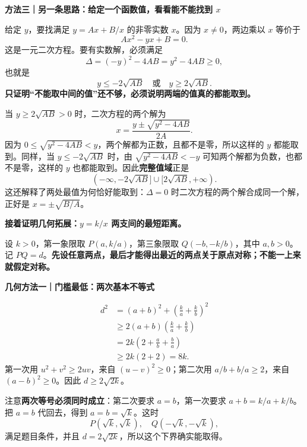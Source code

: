 \begin{proofbox}
\textbf{方法三｜另一条思路：给定一个函数值，看看能不能找到 $x$}



给定 $y$，要找满足 $y=Ax+B/x$ 的非零实数 $x$。因为 $x\ne0$，两边乘以 $x$ 等价于
\[
Ax^2-yx+B=0.
\]
这是一元二次方程。要有实数解，必须满足
\[
\Delta=(-y)^2-4AB=y^2-4AB\ge0,
\]
也就是
\[
\boxed{y\le-2\sqrt{AB}\quad\text{或}\quad y\ge2\sqrt{AB}}.
\]
\textbf{只证明“不能取中间的值”还不够，必须说明两端的值真的都能取到。}

当 $y\ge2\sqrt{AB}>0$ 时，二次方程的两个解为
\[
x=\frac{y\pm\sqrt{y^2-4AB}}{2A}.
\]
因为 $0\le\sqrt{y^2-4AB}<y$，两个解都为正数，且都不是零，所以这样的 $y$ 都能取到。同样，当 $y\le-2\sqrt{AB}$ 时，由 $\sqrt{y^2-4AB}<-y$ 可知两个解都为负数，也都不是零，这样的 $y$ 也都能取到。因此\textbf{完整值域}正是
\[
\boxed{(-\infty,-2\sqrt{AB}]\cup[2\sqrt{AB},+\infty)}.
\]
这还解释了两处最值为何恰好能取到：$\Delta=0$ 时二次方程的两个解合成同一个解，正好是 $x=\pm\sqrt{B/A}$。

\medskip
\end{proofbox}
\clearpage
\begin{proofbox}
\textbf{接着证明几何拓展：$y=k/x$ 两支间的最短距离。}

设 $k>0$，第一象限取 $P(a,k/a)$，第三象限取 $Q(-b,-k/b)$，其中 $a,b>0$。记 $PQ=d$。\textbf{先设任意两点，最后才能得出最近的两点关于原点对称；不能一上来就假定对称。}

\medskip
\textbf{几何方法一｜门槛最低：两次基本不等式}


\[
\begin{aligned}
d^2&=(a+b)^2+\left(\frac ka+\frac kb\right)^2\\
&\ge2(a+b)\left(\frac ka+\frac kb\right)\\
&=2k\left(2+\frac ab+\frac ba\right)\\
&\ge2k(2+2)=8k.
\end{aligned}
\]
第一次用 $u^2+v^2\ge2uv$，来自 $(u-v)^2\ge0$；第二次用 $a/b+b/a\ge2$，来自 $(a-b)^2\ge0$。因此 $d\ge2\sqrt{2k}$。

注意\textbf{两次等号必须同时成立}：第二次要求 $a=b$，第一次要求 $a+b=k/a+k/b$。把 $a=b$ 代回去，得到 $a=b=\sqrt{k}$。这时
\[
P(\sqrt{k},\sqrt{k}),\quad Q(-\sqrt{k},-\sqrt{k}),
\]
满足题目条件，并且 $d=2\sqrt{2k}$，所以这个下界确实能取得。

\medskip
\end{proofbox}
\clearpage

